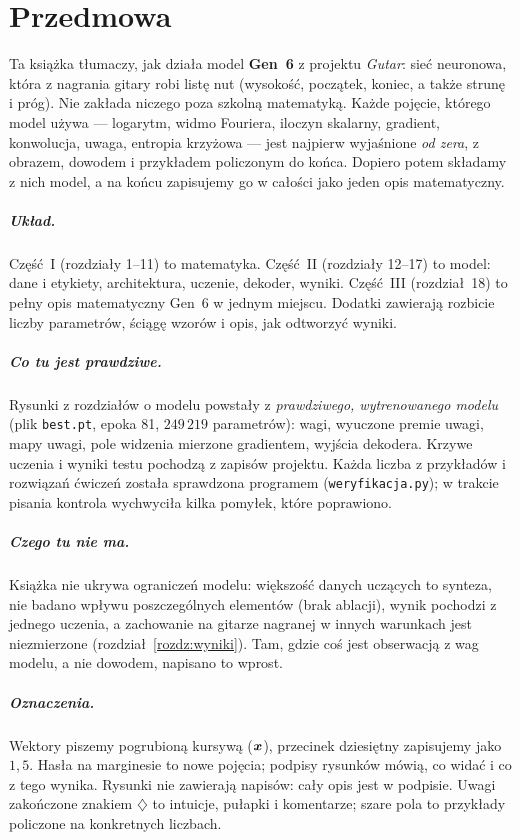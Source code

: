 \chapter*{Przedmowa}

Ta książka tłumaczy, jak działa model \textbf{Gen~6} z projektu \emph{Gutar}: sieć neuronowa, która z nagrania gitary robi listę nut (wysokość, początek, koniec, a także strunę i próg). Nie zakłada niczego poza szkolną matematyką.
Każde pojęcie, którego model używa --- logarytm, widmo Fouriera, iloczyn skalarny, gradient, konwolucja, uwaga, entropia krzyżowa --- jest najpierw wyjaśnione \emph{od zera}, z obrazem, dowodem i przykładem policzonym do końca. Dopiero potem składamy z nich model, a na końcu zapisujemy go w całości jako jeden opis matematyczny.

\paragraph{Układ.} Część~I (rozdziały 1--11) to matematyka. Część~II (rozdziały 12--17) to model: dane i etykiety, architektura, uczenie, dekoder, wyniki. Część~III (rozdział~18) to pełny opis matematyczny Gen~6 w jednym miejscu. Dodatki zawierają rozbicie liczby parametrów, ściągę wzorów i opis, jak odtworzyć wyniki.

\paragraph{Co tu jest prawdziwe.} Rysunki z rozdziałów o modelu powstały z \emph{prawdziwego, wytrenowanego modelu} (plik \texttt{best.pt}, epoka 81, $249\,219$ parametrów): wagi, wyuczone premie uwagi, mapy uwagi, pole widzenia mierzone gradientem, wyjścia dekodera. Krzywe uczenia i wyniki testu pochodzą z zapisów projektu.
Każda liczba z przykładów i rozwiązań ćwiczeń została sprawdzona programem (\texttt{weryfikacja.py}); w trakcie pisania kontrola wychwyciła kilka pomyłek, które poprawiono.

\paragraph{Czego tu nie ma.} Książka nie ukrywa ograniczeń modelu: większość danych uczących to synteza, nie badano wpływu poszczególnych elementów (brak ablacji), wynik pochodzi z jednego uczenia, a zachowanie na gitarze nagranej w innych warunkach jest niezmierzone (rozdział~\ref{rozdz:wyniki}). Tam, gdzie coś jest obserwacją z wag modelu, a nie dowodem, napisano to wprost.

\paragraph{Oznaczenia.} Wektory piszemy pogrubioną kursywą ($\bm{x}$), przecinek dziesiętny zapisujemy jako $1{,}5$. Hasła na marginesie to nowe pojęcia; podpisy rysunków mówią, co widać i co z tego wynika. Rysunki nie zawierają napisów: cały opis jest w podpisie.
Uwagi zakończone znakiem $\diamondsuit$ to intuicje, pułapki i komentarze; szare pola to przykłady policzone na konkretnych liczbach.
